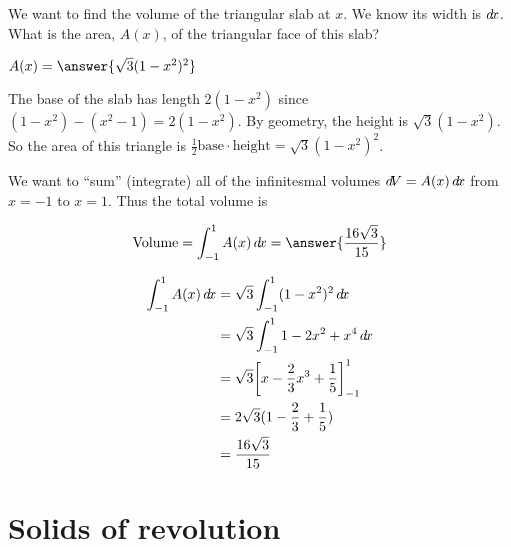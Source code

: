 \documentclass{ximera}
\begin{document}
\begin{example}
\begin{explanation}

We want to find the volume of the triangular slab at $x$. We know its width is $\mathop{}\!d\! x$.  What is the area,  $A(x)$, of the triangular face of this slab?

\begin{question}
	$A(x) = \answer{\sqrt{3}(1-x^2)^2}$
	
	\begin{hint}
		The base of the slab has length $2(1-x^2)$ since $(1-x^2)- (x^2-1) = 2(1-x^2)$. By geometry, the height is $\sqrt{3}(1-x^2)$.  So the area of this triangle is $\frac{1}{2} \textrm{base} \cdot \textrm{height} = \sqrt{3}(1-x^2)^2$.
	\end{hint}	
\end{question}


We want to ``sum'' (integrate) all of the infinitesmal volumes $\mathop{}\!d\! V = A(x) \mathop{}\!d\! x$ from $x=-1$ to $x=1$.
Thus the total volume is

\begin{question}
\[
\textrm{Volume} = \int_{-1}^1 A(x) \d x=\answer{\frac{16\sqrt{3}}{15}}
\]

\begin{hint}
	\begin{align*}
	\int_{-1}^1 A(x) \mathop{}\!d\! x  &= \sqrt{3} \int_{-1}^1 (1-x^2)^2 \mathop{}\!d\! x\\
		&=\sqrt{3} \int_{-1}^1 1-2x^2+x^4 \mathop{}\!d\! x \\
		&=\sqrt{3} \bigg[ x-\frac{2}{3}x^3+\frac{1}{5} \bigg]_{-1}^1\\
		&=2\sqrt{3}(1-\frac{2}{3}+\frac{1}{5})\\
		&=\frac{16\sqrt{3}}{15} 
	\end{align*}
\end{hint}

\end{question}


\end{explanation}
\end{example}

\section{Solids of revolution}
\end{document}
